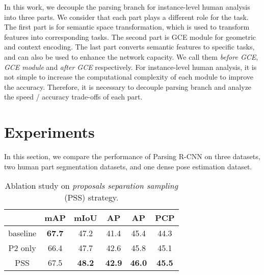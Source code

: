 \documentclass[10pt,twocolumn,letterpaper]{article}
\begin{document}
In this work, we decouple the parsing branch for instance-level human analysis into three parts. We consider that each part plays a different role for the task. The first part is for semantic space transformation, which is used to transform features into corresponding tasks. The second part is GCE module for geometric and context encoding. The last part converts semantic features to specific tasks, and can also be used to enhance the network capacity. We call them \emph{before GCE}, \emph{GCE module} and \emph{after GCE} respectively. For instance-level human analysis, it is not simple to increase the computational complexity of each module to improve the accuracy. Therefore, it is necessary to decouple parsing branch and analyze the speed / accuracy trade-offs of each part. 


\section{Experiments}
\label{sec:exper}

In this section, we compare the performance of Parsing R-CNN on three datasets, two human part segmentation datasets, and one dense pose estimation dataset.

\begin{table}[t]
\centering
\small
\begin{tabular}{c|c|cccc}
& mAP  & mIoU  &  AP & AP  & PCP \\
 \toprule[0.2em]
baseline & \textbf{67.7}  &47.2  & 41.4 & 45.4 & 44.3 \\
P2 only  & 66.4  & 47.7 & 42.6 & 45.8 & 45.1 \\
PSS       & 67.5  &  \textbf{48.2} &  \textbf{42.9}  &  \textbf{46.0}  &  \textbf{45.5}  \\

\end{tabular}
\vspace{.5em}
  \caption{Ablation study on \emph{proposals separation sampling} (PSS) strategy.}
  \label{tab:ablation_pss}
\vspace{-.8em}
\end{table}



\begin{table}[t]
\centering
\small
{}
\vspace{.5em}
  \caption{Ablation study on \emph{enlarging RoI resolution} (ERR) operation, the numbers in brackets are the RoI scales.}
  \label{tab:ablation_err}
\vspace{-.8em}
\end{table}
\end{document}
